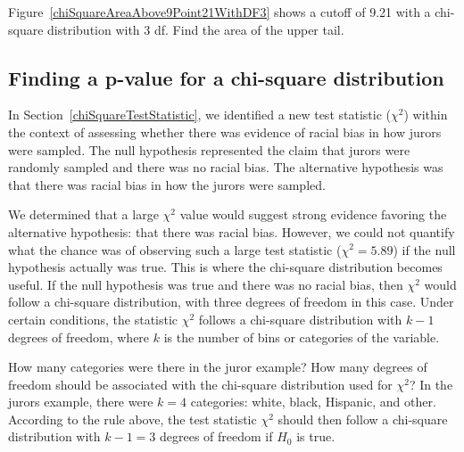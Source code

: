 \begin{exercisewrap}
\begin{nexercise}
Figure~\ref{chiSquareAreaAbove9Point21WithDF3} shows a cutoff of 9.21 with a chi-square distribution with 3 df. Find the area of the upper tail.\footnotemark
\end{nexercise}
\end{exercisewrap}


\D{\newpage}

\subsection{Finding a p-value for a chi-square distribution}
\label{pValueForAChiSquareTest}

In Section~\ref{chiSquareTestStatistic}, we identified a new test statistic ($\chi^2$) within the context of assessing whether there was evidence of racial bias in how jurors were sampled. The null hypothesis represented the claim that jurors were randomly sampled and there was no racial bias. The alternative hypothesis was that there was racial bias in how the jurors were sampled.

We determined that a large $\chi^2$ value would suggest strong evidence favoring the alternative hypothesis: that there was racial bias. However, we could not quantify what the chance was of observing such a large test statistic ($\chi^2=5.89$) if the null hypothesis actually was true. This is where the chi-square distribution becomes useful. If the null hypothesis was true and there was no racial bias, then $\chi^2$ would follow a chi-square distribution, with three degrees of freedom in this case. Under certain conditions, the statistic $\chi^2$ follows a chi-square distribution with $k-1$ degrees of freedom, where $k$ is the number of bins or categories of the variable.

\begin{examplewrap}
\begin{nexample}{How many categories were there in the juror example? How many degrees of freedom should be associated with the chi-square distribution used for $\chi^2$?}
In the jurors example, there were $k=4$ categories: white, black, Hispanic, and other. According to the rule above, the test statistic $\chi^2$ should then follow a chi-square distribution with $k-1 = 3$ degrees of freedom if $H_0$ is true.
\end{nexample}
\end{examplewrap}

